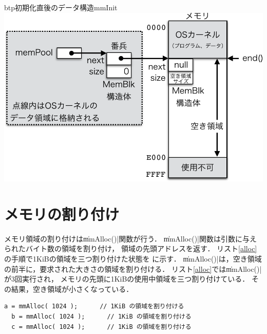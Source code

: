 \begin{myfig}{btp}{初期化直後のデータ構造}{mmInit}
  \includegraphics[scale=0.66]{Fig/mmInit-crop.pdf}
\end{myfig}

\section{メモリの割り付け}
メモリ領域の割り付けは\|mmAlloc()|関数が行う．
\|mmAlloc()|関数は引数に与えられたバイト数の領域を割り付け，
領域の先頭アドレスを返す．
リスト\ref{alloc}の手順で1KiBの領域を三つ割り付けた状態を
に示す．
\|mmAlloc()|は，空き領域の前半に，要求された大きさの領域を割り付ける．
リスト\ref{alloc}では\|mmAlloc()|が3回実行され，
メモリの先頭に1KiBの使用中領域を三つ割り付けている．
その結果，空き領域が小さくなっている．

\begin{lstlisting}[float=btp,label=alloc, caption=1KiBの領域を三つ割り付ける]
  a = mmAlloc( 1024 );      // 1KiB の領域を割り付ける
  b = mmAlloc( 1024 );      // 1KiB の領域を割り付ける
  c = mmAlloc( 1024 );      // 1KiB の領域を割り付ける
\end{lstlisting}

